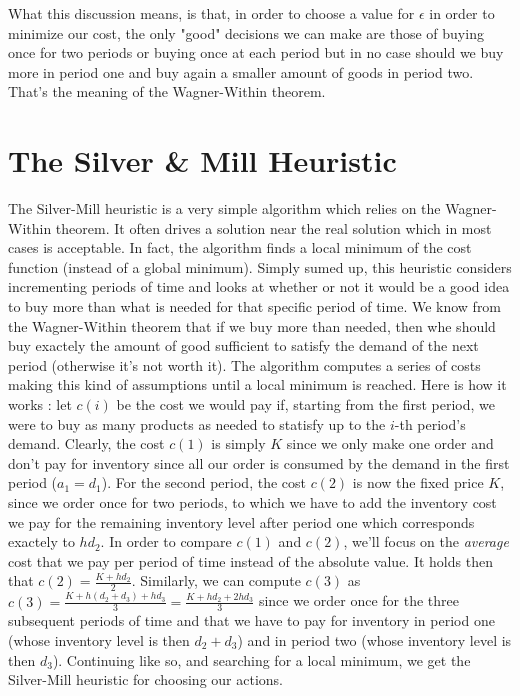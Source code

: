 What this discussion means, is that, in order to choose a value for $\epsilon$ in order to minimize our cost, the only "good" decisions we can make are those of buying once for two periods or buying once at each period but in no case should we buy more in period one and buy again a smaller amount of goods in period two. That's the meaning of the Wagner-Within theorem.

\section{The Silver \& Mill Heuristic}

The Silver-Mill heuristic is a very simple algorithm which relies on the Wagner-Within theorem. It often drives a solution near the real solution which in most cases is acceptable. In fact, the algorithm finds a local minimum of the cost function (instead of a global minimum). Simply sumed up, this heuristic considers incrementing periods of time and looks at whether or not it would be a good idea to buy more than what is needed for that specific period of time. We know from the Wagner-Within theorem that if we buy more than needed, then whe should buy exactely the amount of good sufficient to satisfy the demand of the next period (otherwise it's not worth it). The algorithm computes a series of costs making this kind of assumptions until a local minimum is reached. Here is how it works : let $c(i)$ be the cost we would pay if, starting from the first period, we were to buy as many products as needed to statisfy up to the $i$-th period's demand. Clearly, the cost $c(1)$ is simply $K$ since we only make one order and don't pay for inventory since all our order is consumed by the demand in the first period ($a_1=d_1$). For the second period, the cost $c(2)$ is now the fixed price $K$, since we order once for two periods, to which we have to add the inventory cost we pay for the remaining inventory level after period one which corresponds exactely to $hd_2$. In order to compare $c(1)$ and $c(2)$, we'll focus on the \emph{average} cost that we pay per period of time instead of the absolute value. It holds then that $c(2) = \frac{K+hd_2}{2}$. Similarly, we can compute $c(3)$ as $c(3) = \frac{K + h(d_2+d_3) + hd_3}{3}=\frac{K+hd_2+2hd_3}{3}$ since we order once for the three subsequent periods of time and that we have to pay for inventory in period one (whose inventory level is then $d_2+d_3$) and in period two (whose inventory level is then $d_3$). Continuing like so, and searching for a local minimum, we get the Silver-Mill heuristic for choosing our actions. 

